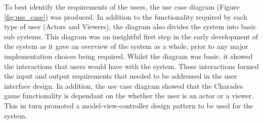 \begin{figure}[h!]
\end{figure}

To best identify the requirements of the users, the use case diagram (Figure \ref{fig:use_case}) was produced. In addition to the functionality required by each type of user (Actors and Viewers), the diagram also divides the system into basic sub systems. This diagram was an insightful first step in the early development of the system as it gave an overview of the system as a whole, prior to any major implementation choices being required. Whilst the diagram was basic, it showed the interactions that users would have with the system. These interactions formed the input and output requirements that needed to be addressed in the user interface design. In addition, the use case diagram showed that the Charades game functionality is dependant on the whether the user is an actor or a viewer. This in turn promoted a model-view-controller design pattern to be used for the system.

